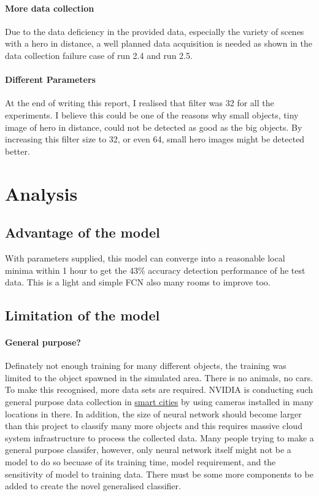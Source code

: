 \documentclass[paper=a4, fontsize=11pt]{scrartcl} %
\numberwithin{equation}{section} %
\numberwithin{figure}{section} %
\numberwithin{table}{section} %
\begin{document}
\paragraph{More data collection}
Due to the data deficiency in the provided data, especially the variety of scenes with a hero in distance, a well planned data acquisition is needed as shown in the data collection failure case of run 2.4 and run 2.5. 
\paragraph{Different Parameters}
At the end of writing this report, I realised that filter was 32 for all the experiments. I believe this could be one of the reasons why small objects, tiny image of hero in distance, could not be detected as good as the big objects. By increasing this filter size to 32, or even 64, small hero images might be detected better.
\pagebreak
\section{Analysis}
\subsection{Advantage of the model}
With parameters supplied, this model can converge into a reasonable local minima within 1 hour to get the 43\% accuracy detection performance of he test data. This is a light and simple FCN also many rooms to improve too.

\subsection{Limitation of the model}
\paragraph{General purpose?}
Definately not enough training for many different objects, the training was limited to the object spawned in the simulated area. There is no animals, no cars. To make this recognised, more data sets are required. NVIDIA is conducting such general purpose data collection in \href{https://www.nvidia.com/en-us/deep-learning-ai/industries/ai-cities/}{smart cities} by using cameras installed in many locations in there. In addition, the size of neural network should become larger than this project to classify many more objects and this requires massive cloud system infrastructure to process the collected data.
Many people trying to make a general purpose classifer, however, only neural network itself might not be a model to do so becuase of its training time, model requirement, and the sensitivity of model to training data. There must be some more components to be added to create the novel generalised classifier.
\end{document}
